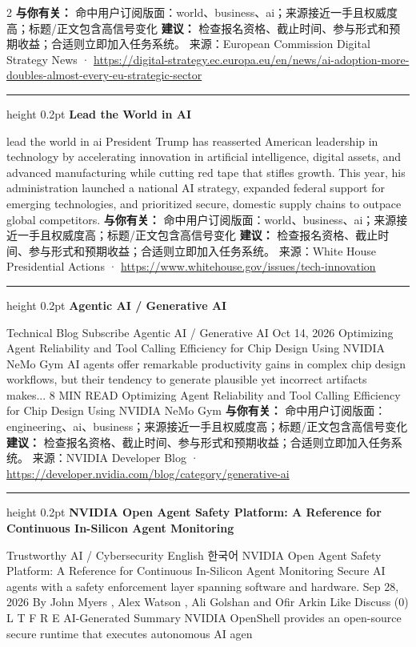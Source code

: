 \documentclass[10.5pt]{ctexart}
\begin{document}
\begin{multicols}{2}
\textbf{与你有关：} 命中用户订阅版面：world、business、ai；来源接近一手且权威度高；标题/正文包含高信号变化
\textbf{建议：} 检查报名资格、截止时间、参与形式和预期收益；合适则立即加入任务系统。
{\footnotesize\color{ormuted} 来源：European Commission Digital Strategy News · \url{https://digital-strategy.ec.europa.eu/en/news/ai-adoption-more-doubles-almost-every-eu-strategic-sector}}
\vspace{2mm}
\hrule height 0.2pt
\vspace{2mm}
{\large\bfseries Lead the World in AI}\par
lead the world in ai President Trump has reasserted American leadership in technology by accelerating innovation in artificial intelligence, digital assets, and advanced manufacturing while cutting red tape that stifles growth. This year, his administration launched a national AI strategy, expanded federal support for emerging technologies, and prioritized secure, domestic supply chains to outpace global competitors.
\textbf{与你有关：} 命中用户订阅版面：world、business、ai；来源接近一手且权威度高；标题/正文包含高信号变化
\textbf{建议：} 检查报名资格、截止时间、参与形式和预期收益；合适则立即加入任务系统。
{\footnotesize\color{ormuted} 来源：White House Presidential Actions · \url{https://www.whitehouse.gov/issues/tech-innovation}}
\vspace{2mm}
\hrule height 0.2pt
\vspace{2mm}
{\large\bfseries Agentic AI / Generative AI}\par
Technical Blog Subscribe Agentic AI / Generative AI Oct 14, 2026 Optimizing Agent Reliability and Tool Calling Efficiency for Chip Design Using NVIDIA NeMo Gym AI agents offer remarkable productivity gains in complex chip design workflows, but their tendency to generate plausible yet incorrect artifacts makes... 8 MIN READ Optimizing Agent Reliability and Tool Calling Efficiency for Chip Design Using NVIDIA NeMo Gym 
\textbf{与你有关：} 命中用户订阅版面：engineering、ai、business；来源接近一手且权威度高；标题/正文包含高信号变化
\textbf{建议：} 检查报名资格、截止时间、参与形式和预期收益；合适则立即加入任务系统。
{\footnotesize\color{ormuted} 来源：NVIDIA Developer Blog · \url{https://developer.nvidia.com/blog/category/generative-ai}}
\vspace{2mm}
\hrule height 0.2pt
\vspace{2mm}
{\large\bfseries NVIDIA Open Agent Safety Platform: A Reference for Continuous In-Silicon Agent Monitoring}\par
Trustworthy AI / Cybersecurity English 한국어 NVIDIA Open Agent Safety Platform: A Reference for Continuous In-Silicon Agent Monitoring Secure AI agents with a safety enforcement layer spanning software and hardware. Sep 28, 2026 By John Myers , Alex Watson , Ali Golshan and Ofir Arkin Like Discuss (0) L T F R E AI-Generated Summary NVIDIA OpenShell provides an open-source secure runtime that executes autonomous AI agen

\end{multicols}
\end{document}
